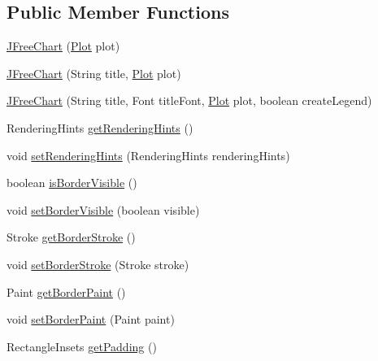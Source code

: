 \subsection*{Public Member Functions}
\begin{DoxyCompactItemize}
\item 
\mbox{\hyperlink{classorg_1_1jfree_1_1chart_1_1_j_free_chart_a21ac385ae4cbb4cdea92b15732c3fadf}{J\+Free\+Chart}} (\mbox{\hyperlink{classorg_1_1jfree_1_1chart_1_1plot_1_1_plot}{Plot}} plot)
\item 
\mbox{\hyperlink{classorg_1_1jfree_1_1chart_1_1_j_free_chart_a2909eb0091816ddf207fa7bad8e035f9}{J\+Free\+Chart}} (String title, \mbox{\hyperlink{classorg_1_1jfree_1_1chart_1_1plot_1_1_plot}{Plot}} plot)
\item 
\mbox{\hyperlink{classorg_1_1jfree_1_1chart_1_1_j_free_chart_ae7347713dca5fafd5eca60739e6ffc66}{J\+Free\+Chart}} (String title, Font title\+Font, \mbox{\hyperlink{classorg_1_1jfree_1_1chart_1_1plot_1_1_plot}{Plot}} plot, boolean create\+Legend)
\item 
Rendering\+Hints \mbox{\hyperlink{classorg_1_1jfree_1_1chart_1_1_j_free_chart_a5fc5f46f5bfff156c5ea85984a618f65}{get\+Rendering\+Hints}} ()
\item 
void \mbox{\hyperlink{classorg_1_1jfree_1_1chart_1_1_j_free_chart_a770652c440a2e4482389ef1608c31e09}{set\+Rendering\+Hints}} (Rendering\+Hints rendering\+Hints)
\item 
boolean \mbox{\hyperlink{classorg_1_1jfree_1_1chart_1_1_j_free_chart_a7841abb23a8d2f417b8f424cfd5aed5c}{is\+Border\+Visible}} ()
\item 
void \mbox{\hyperlink{classorg_1_1jfree_1_1chart_1_1_j_free_chart_a5c51189211b4cff88055842e15527453}{set\+Border\+Visible}} (boolean visible)
\item 
Stroke \mbox{\hyperlink{classorg_1_1jfree_1_1chart_1_1_j_free_chart_a505a44c119435bb9f7b8cb15d6bec167}{get\+Border\+Stroke}} ()
\item 
void \mbox{\hyperlink{classorg_1_1jfree_1_1chart_1_1_j_free_chart_a1be1fe771e4369d7b425a77bc8ba3d71}{set\+Border\+Stroke}} (Stroke stroke)
\item 
Paint \mbox{\hyperlink{classorg_1_1jfree_1_1chart_1_1_j_free_chart_ad054ae2945e4634fd962c9bf2029c15f}{get\+Border\+Paint}} ()
\item 
void \mbox{\hyperlink{classorg_1_1jfree_1_1chart_1_1_j_free_chart_ad6e69d2966aaecdbc060d61a39bf5e1c}{set\+Border\+Paint}} (Paint paint)
\item 
Rectangle\+Insets \mbox{\hyperlink{classorg_1_1jfree_1_1chart_1_1_j_free_chart_a56dff2dce4f2eb661215aad988887d8f}{get\+Padding}} ()

\end{DoxyCompactItemize}
